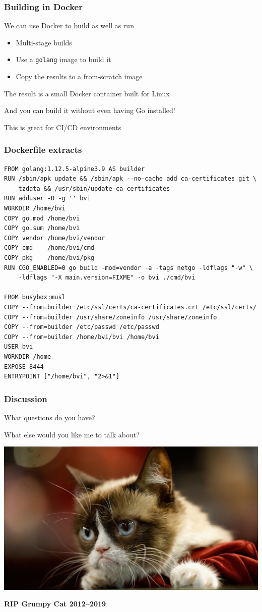\documentclass[handout,compress,t,11pt]{beamer}
\begin{document}
\begin{frame}[fragile]
    \frametitle{Building in Docker}
We can use Docker to build as well as run
\begin{itemize}
    \item Multi-stage builds
    \item Use a \verb|golang| image to build it
    \item Copy the results to a from-scratch image
\end{itemize}
\vspace{2\baselineskip}
The result is a small Docker container built for Linux \par
\vspace{\baselineskip}
And you can build it without even having Go installed! \par
\vspace{\baselineskip}
This is great for CI/CD environments
\end{frame}

\begin{frame}[fragile]
    \frametitle{Dockerfile extracts}
{\scriptsize
\begin{verbatim}
FROM golang:1.12.5-alpine3.9 AS builder
RUN /sbin/apk update && /sbin/apk --no-cache add ca-certificates git \
    tzdata && /usr/sbin/update-ca-certificates
RUN adduser -D -g '' bvi
WORKDIR /home/bvi
COPY go.mod /home/bvi
COPY go.sum /home/bvi
COPY vendor /home/bvi/vendor
COPY cmd    /home/bvi/cmd
COPY pkg    /home/bvi/pkg
RUN CGO_ENABLED=0 go build -mod=vendor -a -tags netgo -ldflags "-w" \
    -ldflags "-X main.version=FIXME" -o bvi ./cmd/bvi

FROM busybox:musl
COPY --from=builder /etc/ssl/certs/ca-certificates.crt /etc/ssl/certs/
COPY --from=builder /usr/share/zoneinfo /usr/share/zoneinfo
COPY --from=builder /etc/passwd /etc/passwd
COPY --from=builder /home/bvi/bvi /home/bvi
USER bvi
WORKDIR /home
EXPOSE 8444
ENTRYPOINT ["/home/bvi", "2>&1"]
\end{verbatim}}
\end{frame}

\begin{frame}[fragile]
    \frametitle{Discussion}
What questions do you have? \par
\vspace{0.4\baselineskip}
What else would you like me to talk about? \par
\vspace{1.6\baselineskip}
\begin{center}
\includegraphics[width=.6\textwidth]{grumpy-cat-90.jpg}
\par {\small\bf RIP Grumpy Cat 2012--2019}
\end{center}
\end{frame}
\end{document}
